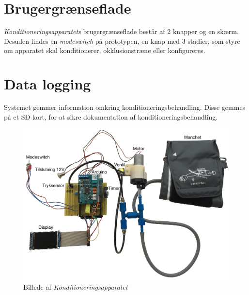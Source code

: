 \section{Brugergrænseflade}
\textit{Konditioneringsapparatets} brugergrænseflade består af 2 knapper og en skærm. Desuden findes en \textit{modeswitch} på prototypen, en knap med 3 stadier, som styre om apparatet skal konditionerer, okklusionstræne eller konfigureres.  

\section{Data logging}
Systemet gemmer information omkring konditioneringsbehandling. Disse gemmes på et SD kort, for at sikre dokumentation af konditioneringsbehandling.

\begin{figure}[H]
	\centering
	\includegraphics[width = \textwidth]{billeder/Konditioneringsapparat-tekst.png}
	\caption{Billede af \textit{Konditioneringsapparatet}} \label{fig:oversigtsbillede}
\end{figure}